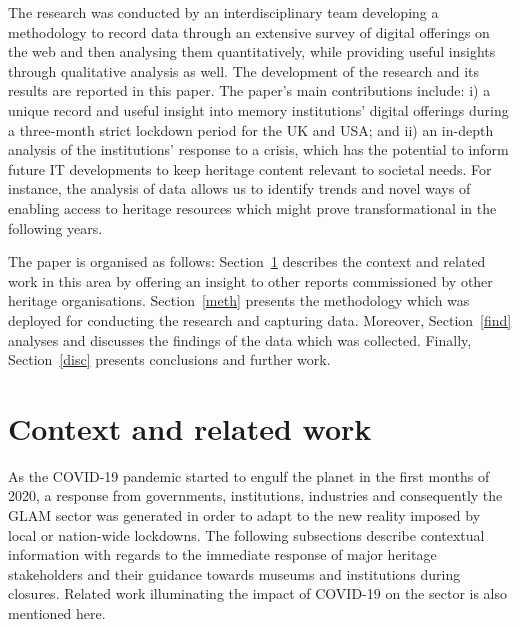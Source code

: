 \documentclass{egpubl}
\begin{document}
The research was conducted by an interdisciplinary team developing a methodology to record data through an extensive survey of digital offerings on the web and then analysing them quantitatively, while providing useful insights through qualitative analysis as well. The development of the research and its results are reported in this paper. The paper’s main contributions include: i) a unique record and useful insight into memory institutions’ digital offerings during a three-month strict lockdown period for the UK and USA; and ii) an in-depth analysis of the institutions' response to a crisis, which has the potential to inform future IT developments to keep heritage content relevant to societal needs. For instance, the analysis of data allows us to identify trends and novel ways of enabling access to heritage resources which might prove transformational in the following years.

The paper is organised as follows: Section~\ref{conrel} describes the context and related work in this area by offering an insight to other reports commissioned by other heritage organisations. Section~\ref{meth} presents the methodology which was deployed for conducting the research and capturing data. Moreover, Section~\ref{find} analyses and discusses the findings of the data which was collected. Finally, Section~\ref{disc} presents conclusions and further work.  

\section{Context and related work}
\label{conrel}
As the COVID-19 pandemic started to engulf the planet in the first months of 2020, a response from governments, institutions, industries and consequently the GLAM sector was generated in order to adapt to the new reality imposed by local or nation-wide lockdowns. The following subsections describe contextual information with regards to the immediate response of major heritage stakeholders and their guidance towards museums and institutions during closures. Related work illuminating the impact of COVID-19 on the sector is also mentioned here.
\end{document}

